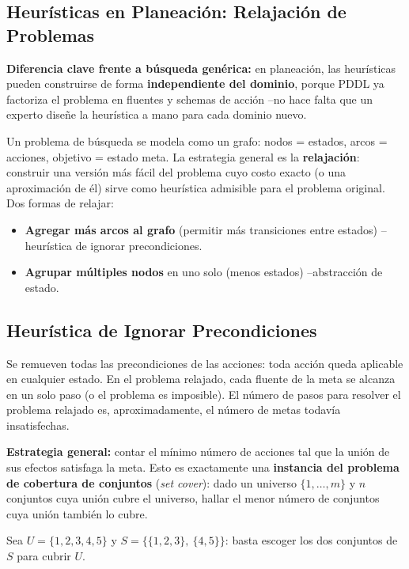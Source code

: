 \subsection{Heurísticas en Planeación: Relajación de Problemas}

\textbf{Diferencia clave frente a búsqueda genérica:} en planeación, las heurísticas pueden
construirse de forma \textbf{independiente del dominio}, porque PDDL ya factoriza el problema en
fluentes y schemas de acción --no hace falta que un experto diseñe la heurística a mano para cada
dominio nuevo.

Un problema de búsqueda se modela como un grafo: nodos = estados, arcos = acciones, objetivo =
estado meta. La estrategia general es la \textbf{relajación}: construir una versión más fácil del
problema cuyo costo exacto (o una aproximación de él) sirve como heurística admisible para el
problema original. Dos formas de relajar:
\begin{itemize}
    \item \textbf{Agregar más arcos al grafo} (permitir más transiciones entre estados) --heurística
    de ignorar precondiciones.
    \item \textbf{Agrupar múltiples nodos} en uno solo (menos estados) --abstracción de estado.
\end{itemize}

\subsection{Heurística de Ignorar Precondiciones}

\begin{definition}
Se remueven todas las precondiciones de las acciones: toda acción queda aplicable en cualquier
estado. En el problema relajado, cada fluente de la meta se alcanza en un solo paso (o el problema
es imposible). El número de pasos para resolver el problema relajado es, aproximadamente, el número
de metas todavía insatisfechas.
\end{definition}

\textbf{Estrategia general:} contar el mínimo número de acciones tal que la unión de sus efectos
satisfaga la meta. Esto es exactamente una \textbf{instancia del problema de cobertura de conjuntos}
(\textit{set cover}): dado un universo $\{1,\ldots,m\}$ y $n$ conjuntos cuya unión cubre el universo,
hallar el menor número de conjuntos cuya unión también lo cubre.

\begin{example}
Sea $U=\{1,2,3,4,5\}$ y $S=\{\{1,2,3\},\ \{4,5\}\}$: basta escoger los dos conjuntos de $S$ para
cubrir $U$.
\end{example}

